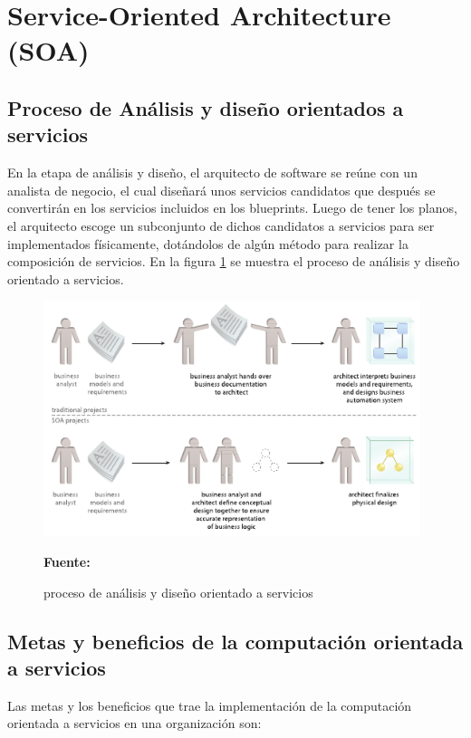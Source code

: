 \section{Service-Oriented Architecture (SOA)}
\subsection{Proceso de Análisis y diseño orientados a servicios}

En la etapa de análisis y diseño, el arquitecto de software se reúne con un analista de negocio, el cual diseñará unos servicios candidatos que después se convertirán en los servicios incluidos en los blueprints. Luego de tener los planos, el arquitecto escoge un subconjunto de dichos candidatos a servicios para ser implementados físicamente, dotándolos de algún método para realizar la composición de servicios. En la figura \ref{fig:seis} se muestra el proceso de análisis y diseño orientado a servicios.

\begin{figure}[!htb]
  \begin{center}
    \includegraphics[width=11cm]{./imagenes/6.png}
    \caption{proceso de análisis y diseño orientado a servicios}
    \label{fig:seis}
    \textbf{Fuente:}  \cite{soa_principles}
  \end{center}
\end{figure}

\subsection{Metas y beneficios de la computación orientada a servicios }

Las metas y los beneficios que trae la implementación de la computación orientada a servicios en una organización son:


